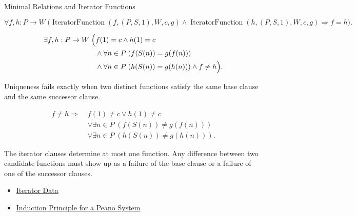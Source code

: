 \begin{topicbox}{Minimal Relations and Iterator Functions}
\begin{remark*}
\[
\forall f,h:P\to W\;
\bigl(\operatorname{IteratorFunction}(f,(P,S,1),W,c,g)
\land \operatorname{IteratorFunction}(h,(P,S,1),W,c,g)
\Longrightarrow f=h\bigr).
\]
\end{remark*}

\begin{remark*}
\[
\begin{aligned}
\exists f,h:P\to W\;\Bigl(&
f(1)=c\land h(1)=c\\
&\land \forall n\in P\;(f(S(n))=g(f(n)))\\
&\land \forall n\in P\;(h(S(n))=g(h(n)))
\land f\neq h\Bigr).
\end{aligned}
\]
\end{remark*}

\begin{remark*}
Uniqueness fails exactly when two distinct functions satisfy the same base
clause and the same successor clause.
\end{remark*}

\begin{remark*}
\[
\begin{aligned}
f\neq h
\Longrightarrow\;&
f(1)\neq c\lor h(1)\neq c\\
&\lor \exists n\in P\;(f(S(n))\neq g(f(n)))\\
&\lor \exists n\in P\;(h(S(n))\neq g(h(n))).
\end{aligned}
\]
\end{remark*}

\begin{remark*}[Interpretation]
The iterator clauses determine at most one function. Any difference between
two candidate functions must show up as a failure of the base clause or a
failure of one of the successor clauses.
\end{remark*}

\begin{dependencies}
\begin{itemize}
  \item \hyperref[def:iterator-data-on-peano-system]{Iterator Data}
  \item \hyperref[thm:induction-principle-for-peano-system]{Induction Principle for a Peano System}
\end{itemize}
\end{dependencies}


\end{topicbox}
